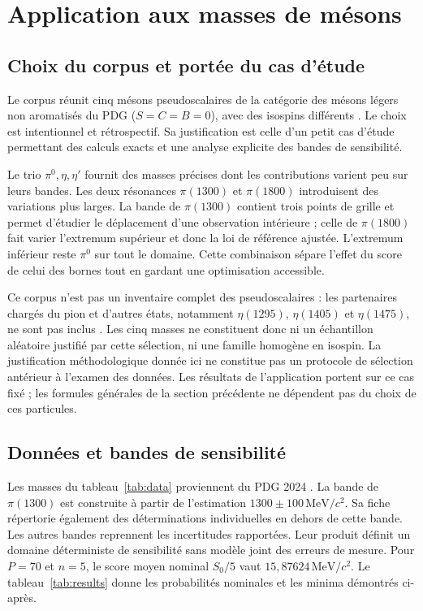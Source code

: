 \documentclass[11pt,a4paper]{article}
\newcommand{\unit}{\,\mathrm{MeV}/c^{2}}
\begin{document}
\section{Application aux masses de mésons}\label{sec:application}

\subsection{Choix du corpus et portée du cas d'étude}

Le corpus réunit cinq mésons pseudoscalaires de la catégorie des mésons légers non aromatisés du PDG ($S=C=B=0$), avec des isospins différents \cite{pdg}. Le choix est intentionnel et rétrospectif. Sa justification est celle d'un petit cas d'étude permettant des calculs exacts et une analyse explicite des bandes de sensibilité.

Le trio $\pi^0,\eta,\eta'$ fournit des masses précises dont les contributions varient peu sur leurs bandes. Les deux résonances $\pi(1300)$ et $\pi(1800)$ introduisent des variations plus larges. La bande de $\pi(1300)$ contient trois points de grille et permet d'étudier le déplacement d'une observation intérieure ; celle de $\pi(1800)$ fait varier l'extremum supérieur et donc la loi de référence ajustée. L'extremum inférieur reste $\pi^0$ sur tout le domaine. Cette combinaison sépare l'effet du score de celui des bornes tout en gardant une optimisation accessible.

Ce corpus n'est pas un inventaire complet des pseudoscalaires : les partenaires chargés du pion et d'autres états, notamment $\eta(1295)$, $\eta(1405)$ et $\eta(1475)$, ne sont pas inclus \cite{pdg}. Les cinq masses ne constituent donc ni un échantillon aléatoire justifié par cette sélection, ni une famille homogène en isospin. La justification méthodologique donnée ici ne constitue pas un protocole de sélection antérieur à l'examen des données. Les résultats de l'application portent sur ce cas fixé ; les formules générales de la section précédente ne dépendent pas du choix de ces particules.

\subsection{Données et bandes de sensibilité}

Les masses du tableau~\ref{tab:data} proviennent du PDG 2024 \cite{pdg,pion}. La bande de $\pi(1300)$ est construite à partir de l'estimation $1300\pm100\unit$. Sa fiche répertorie également des déterminations individuelles en dehors de cette bande. Les autres bandes reprennent les incertitudes rapportées. Leur produit définit un domaine déterministe de sensibilité sans modèle joint des erreurs de mesure. Pour $P=70$ et $n=5$, le score moyen nominal $S_0/5$ vaut $15{,}87624\unit$. Le tableau~\ref{tab:results} donne les probabilités nominales et les minima démontrés ci-après.
\end{document}
